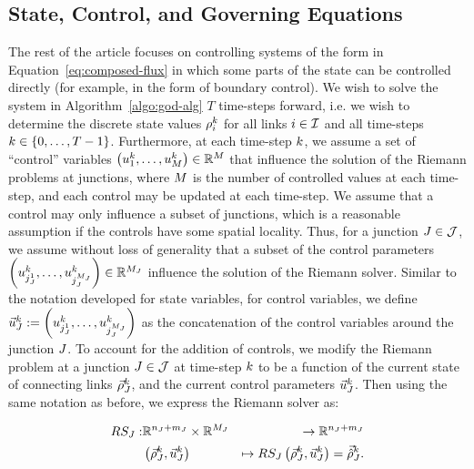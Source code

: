 \subsection{State, Control, and Governing Equations\label{sec:State,-control,-and}}

The rest of the article focuses on controlling systems of the form
in Equation~\eqref{eq:composed-flux} in which some parts of the state
can be controlled directly (for example, in the form of boundary control).
We wish to solve the system in Algorithm~\ref{algo:god-alg} $T$
time-steps forward, i.e. we wish to determine the discrete state values
$\rho_{i}^{k}$ for all links $i\in\mathcal{I}$ and all
time-steps $k\in\left\{ 0,\ldots,T-1\right\}$. Furthermore, at each
time-step $k$, we assume a set of ``control'' variables $\left(u_{1}^{k},\ldots,u_{M}^{k}\right)\in\mathbb{R}^{M}$
that influence the solution of the Riemann problems at junctions,
where $M$ is the number of controlled values at each time-step,
and each control may be updated at each time-step. We assume that
a control may only influence a subset of junctions, which is a reasonable
assumption if the controls have some spatial locality. Thus, for a
junction $J\in\mathcal{J}$, we assume without loss of generality that
a subset of the control parameters $\left(u_{j_{J}^{1}}^{k},\ldots,u_{j_{J}^{M_{J}}}^{k}\right)\in\mathbb{R}^{M_{J}}$
influence the solution of the Riemann solver. Similar to the notation
developed for state variables, for control variables, we define $\vec{u}_{J}^{k}:=\left(u_{j_{J}^{1}}^{k},\ldots,u_{j_{J}^{M_{J}}}^{k}\right)$
as the concatenation of the control variables around the junction
$J$. To account for the addition of controls, we modify the Riemann
problem at a junction $J\in\mathcal{J}$ at time-step $k$ to be a
function of the current state of connecting links $\vec{\rho}_{J}^{k}$,
and the current control parameters $\vec{u}_{J}^{k}$. Then using
the same notation as before, we express the Riemann solver as:

\begin{eqnarray*}
	RS_{J}: & \mathbb{R}^{n_{J}+m_{J}}\times\mathbb{R}^{M_{J}} & \rightarrow\mathbb{R}^{n_{J}+m_{J}}\\
	& \left(\vec{\rho}_{J}^{k},\vec{u}_{J}^{k}\right) & \mapsto RS_{J}\left(\vec{\rho}_{J}^{k},\vec{u}_{J}^{k}\right)=\vec{\hat{\rho}}_{J}^{k}.
\end{eqnarray*}



